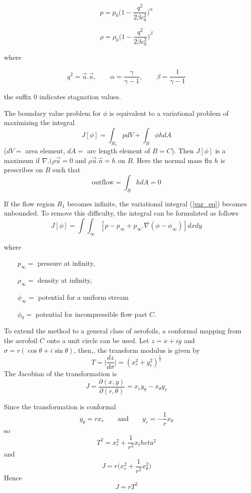 \documentclass[a4paper]{report}
\begin{document}
	$$p=p_0 \Biggl(
	1-\frac{q^2}{2\beta c^2_0}
	\Biggr)^\alpha$$

	$$\rho=\rho_0 \Biggl(
	1-\frac{q^2}{2\beta c^2_0}
	\Biggr)^\beta$$	
	
	where
	
	$$q^2 = \vec{u}.\vec{u}, \qquad \alpha=\frac{\gamma}{\gamma-1},
	\qquad \beta=\frac{1}{\gamma-1}$$
	
	the suffix $0$ indicates stagnation values.
	
	The boundary value problem for $\phi$ is equivalent to a variational problem of maximizing the integral 
	\begin{equation} \label{var_eq}
		 J[\phi] = \int_{R_1} pdV + \int_B\phi h dA
	\end{equation}
	($dV = $ area element, $dA = $ arc length element of $B=C$). Then $J[\phi]$ is a maximum if $\nabla.(\rho \vec{u} = 0$ and
	$\rho\vec{u}.\hat{n} = h$ on $B$. Here the normal mass flu $h$ is prescribes on $B$ such that 
	$$ \text{outflow} = \int_B hdA = 0$$
	
	If the flow region $R_1$ becomes infinite, the variational integral (\ref{var_eq}) becomes unbounded. To remove this difficulty, the integral can be formulated as follows
	\begin{equation} \label{var_eq2}
		J[\phi] = \int\int_\infty [ p-p_\infty+p_\infty.\nabla(\phi-\phi_\infty) ]dxdy
	\end{equation}
	
	where 
	
	$\qquad p_\infty = $ pressure at infinity, 
	
	$\qquad \rho_\infty = $ density at infinity, 
	
	$\qquad \phi_\infty = $ potential for a uniform stream 
	
	$\qquad \phi_0 = $ potential for incompressible flow past $C$.
	
	To extend the method to a general class of aerofoils, a conformal mapping from the aerofoil $C$ onto a unit circle can be used. Let $z=x+iy$ and $\sigma=r(\cos \theta + i \sin \theta)$, then,, the transform modulus is given by	
	$$
	T = \Biggl|\frac{dz}{d\sigma}\Biggr|
	= (x_r^2+y_r^2)^\frac{1}{2}
	$$
	The Jacobian of the transformation is
	$$
	J= \frac{\partial(x,y)}{\partial(r,\theta)}
	= x_r y_\theta - x_\theta y_r
	$$
	
	Since the transformation is conformal
	$$
	y_\theta = rx_r \qquad \text{and} \qquad y_r=-\frac{1}{r}x_\theta
	$$
	so
	$$
	T^2 = x_r^2 + \frac{1}{r^2}x_theta^2
	$$
	and
	$$
	J=r\Biggl(
	x^2_r+\frac{1}{r^2}x^2_\theta
	\Biggr)
	$$
	Hence 
	\begin{equation} \label{J}
		 J=rT^2
	\end{equation}
	
\end{document}

